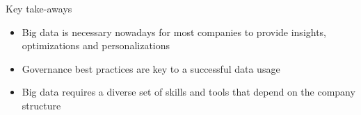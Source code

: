 \begin{frame}{Key take-aways}
  \begin{itemize}
    \item Big data is necessary nowadays for most companies to provide insights, optimizations and personalizations
    \item Governance best practices are key to a successful data usage
    \item Big data requires a diverse set of skills and tools that depend on the company structure
  \end{itemize}
\end{frame}
